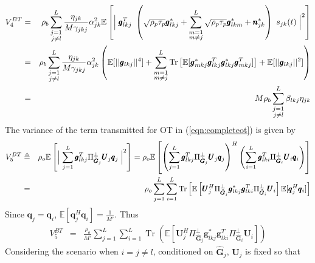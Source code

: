 \documentclass[10pt, a4paper, twoside,fleqn]{article}
\DeclareMathOperator{\Tr}{Tr}
\begin{document}
\begin{eqnarray}
V_4^{BT} &=& \rho_b\sum_{\substack{j=1 \\ j \neq l}}^{L}\frac{\eta_{jk}}{M\gamma_{jkj}}\alpha_{jk}^2\mathbb{E}\left[\Bigm| \pmb{g}_{lkj}^T \ \left(\sqrt{\rho_p\tau_p}\pmb{g}^*_{lkj}
                          			 +\sum_{\substack{m=1 \\ m \neq j}}^{L} \sqrt{\rho_p\tau_p}\pmb{g}^*_{lkm}
             			   			 +\pmb{n}^*_{jk}\right) 
             			   	\ s_{jk} (t)\Bigm|^2\right] \nonumber \\
         &=& \rho_b\sum_{\substack{j=1 \\ j \neq l}}^{L}\frac{\eta_{jk}}{M\gamma_{jkj}}\alpha_{jk}^2\left(\mathbb{E}[||\pmb{g}_{lkj}||^4] + \sum\limits_{\substack{m=1 \\ m\neq j}}^{L}\Tr\left[\mathbb{E}[\pmb{g}^*_{mkj}\pmb{g}^T_{lkj}\pmb{g}^*_{lkj}\pmb{g}^T_{mkj}]\right]+\mathbb{E}[||\pmb{g}_{lkj}||^2]\right) \nonumber \\
    &=& M\rho_b\sum\limits_{\substack{j=1 \\ j \neq l}}^{L}\beta_{lkj}\eta_{jk}
\end{eqnarray}
The variance of the term transmitted for OT in (\ref{eqn:completeot}) is given by
\begin{eqnarray}
	V_5^{BT} &\triangleq& \rho_o\mathbb{E}\left[\Bigm|\sum_{j=1}^{L}\pmb{g}_{lkj}^T\Pi^{\perp}_{{\hat{\pmb{G}}_j}}\pmb{U}_j \pmb{q}_{j}\Bigm|^2\right] = \rho_o\mathbb{E}\left[\left(\sum_{j=1}^{L}\pmb{g}_{lkj}^T\Pi^{\perp}_{{\hat{\pmb{G}}_j}}\pmb{U}_j \pmb{q}_{j}\right)^H\left(\sum_{i=1}^{L}\pmb{g}_{lki}^T\Pi^{\perp}_{{\hat{\pmb{G}}_i}}\pmb{U}_i \pmb{q}_{i}\right)\right]  \nonumber \\
	        &=& \rho_o\sum\limits_{j=1}^{L}\sum\limits_{i=1}^{L}\Tr\left[\mathbb{E}\left[\pmb{U}_j^H \Pi^{\perp}_{\pmb{\hat{G}}_j} \pmb{g}_{lkj}^* \pmb{g}_{lki}^{T}\Pi^{\perp}_{\pmb{\hat G}_i} \pmb{U}_i\right]\mathbb{E}[\pmb{q}_j^H\pmb{q}_i]\right]
\end{eqnarray}
Since $\pmb{q}_j=\pmb{q}_i$, $\mathbb{E}[\pmb{q}_j^H\pmb{q}_i]=\frac{1}{M'}$. Thus
\begin{eqnarray}\label{eqn:noiseF4_1}	    
           V_5^{BT} &=&       \frac{\rho_o}{M'}\sum_{j=1}^{L}\sum_{i=1}^{L} \Tr\left(\mathbb{E}\left[\pmb{U}_j^H \Pi^{\perp}_{\pmb{\hat{G}}_j} \pmb{g}_{lkj}^* \pmb{g}_{lki}^{T}\Pi^{\perp}_{\pmb{\hat G}_i} \pmb{U}_i\right]\right)
\end{eqnarray}
Considering the scenario when $i=j\neq l$, conditioned on $\pmb{\hat G}_j$, $\pmb{U}_j$ is fixed so that
\end{document}
